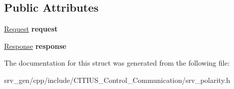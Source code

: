\subsection*{\-Public \-Attributes}
\begin{DoxyCompactItemize}
\item 
\hypertarget{struct_c_i_t_i_u_s___control___communication_1_1srv__polarity_aeb157b9d3f7cc6e83fb77b0826ec4c38}{\hyperlink{struct_c_i_t_i_u_s___control___communication_1_1srv__polarity_request__}{\-Request} {\bfseries request}}\label{struct_c_i_t_i_u_s___control___communication_1_1srv__polarity_aeb157b9d3f7cc6e83fb77b0826ec4c38}

\item 
\hypertarget{struct_c_i_t_i_u_s___control___communication_1_1srv__polarity_ac2b90df1716ceb9811c4ae0a194f6d20}{\hyperlink{struct_c_i_t_i_u_s___control___communication_1_1srv__polarity_response__}{\-Response} {\bfseries response}}\label{struct_c_i_t_i_u_s___control___communication_1_1srv__polarity_ac2b90df1716ceb9811c4ae0a194f6d20}

\end{DoxyCompactItemize}


\-The documentation for this struct was generated from the following file\-:\begin{DoxyCompactItemize}
\item 
srv\-\_\-gen/cpp/include/\-C\-I\-T\-I\-U\-S\-\_\-\-Control\-\_\-\-Communication/srv\-\_\-polarity.\-h\end{DoxyCompactItemize}
